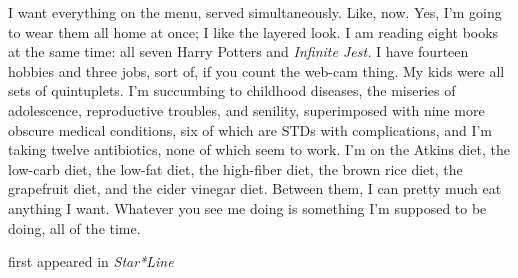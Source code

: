 
I want everything on the menu, served simultaneously. Like, now. Yes,
I'm going to wear them all home at once; I like the layered look. I am
reading eight books at the same time: all seven Harry Potters and
\emph{Infinite Jest.} I have fourteen hobbies and three jobs, sort of,
if you count the web-cam thing. My kids were all sets of quintuplets.
I'm succumbing to childhood diseases, the miseries of adolescence,
reproductive troubles, and senility, superimposed with nine more obscure
medical conditions, six of which are STDs with complications, and I'm
taking twelve antibiotics, none of which seem to work. I'm on the Atkins
diet, the low-carb diet, the low-fat diet, the high-fiber diet, the
brown rice diet, the grapefruit diet, and the cider vinegar diet.
Between them, I can pretty much eat anything I want. Whatever you see me
doing is something I'm supposed to be doing, all of the time.

first appeared in \emph{Star*Line}
